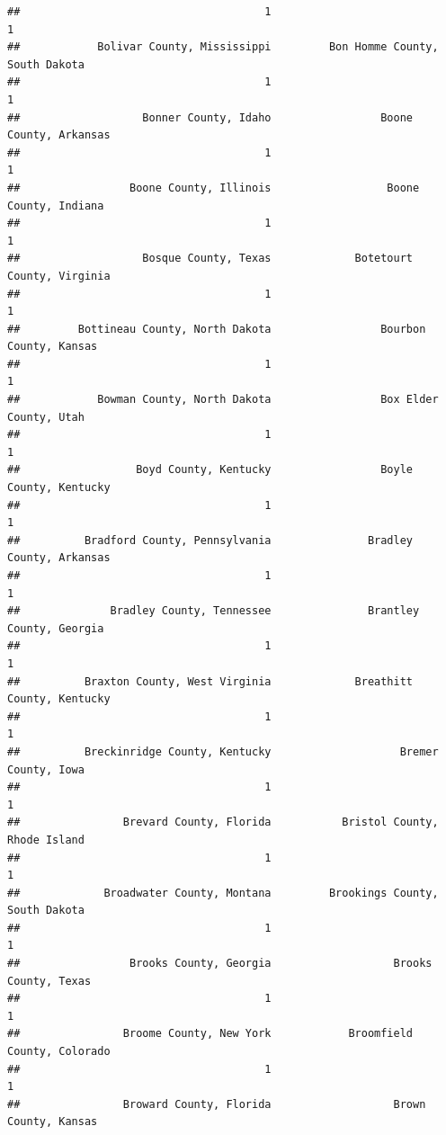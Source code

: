 \documentclass[
]{article}
\begin{document}
\begin{verbatim}
##                                      1                                      1 
##            Bolivar County, Mississippi         Bon Homme County, South Dakota 
##                                      1                                      1 
##                   Bonner County, Idaho                 Boone County, Arkansas 
##                                      1                                      1 
##                 Boone County, Illinois                  Boone County, Indiana 
##                                      1                                      1 
##                   Bosque County, Texas             Botetourt County, Virginia 
##                                      1                                      1 
##         Bottineau County, North Dakota                 Bourbon County, Kansas 
##                                      1                                      1 
##            Bowman County, North Dakota                 Box Elder County, Utah 
##                                      1                                      1 
##                  Boyd County, Kentucky                 Boyle County, Kentucky 
##                                      1                                      1 
##          Bradford County, Pennsylvania               Bradley County, Arkansas 
##                                      1                                      1 
##              Bradley County, Tennessee               Brantley County, Georgia 
##                                      1                                      1 
##          Braxton County, West Virginia             Breathitt County, Kentucky 
##                                      1                                      1 
##          Breckinridge County, Kentucky                    Bremer County, Iowa 
##                                      1                                      1 
##                Brevard County, Florida           Bristol County, Rhode Island 
##                                      1                                      1 
##             Broadwater County, Montana         Brookings County, South Dakota 
##                                      1                                      1 
##                 Brooks County, Georgia                   Brooks County, Texas 
##                                      1                                      1 
##                Broome County, New York            Broomfield County, Colorado 
##                                      1                                      1 
##                Broward County, Florida                   Brown County, Kansas 

\end{verbatim}
\end{document}
